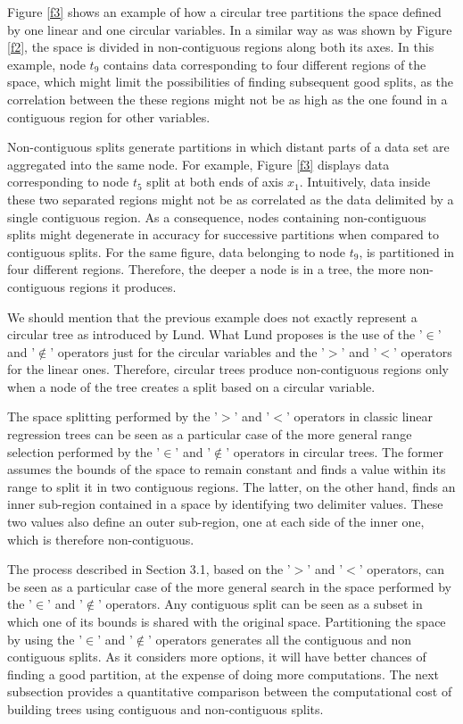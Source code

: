 \documentclass[times,twocolumn,final,authoryear]{elsarticle}
\begin{document}
Figure \ref{f3} shows an example of how a circular tree partitions the space defined by one linear and one circular variables. In a similar way as was shown by Figure \ref{f2}, the space is divided in non-contiguous regions along both its axes. In this example, node $t_9$ contains data corresponding to four different regions of the space, which might limit the possibilities of finding subsequent good splits, as the correlation between the these regions might not be as high as the one found in a contiguous region for other variables. 

Non-contiguous splits generate partitions in which distant parts of a data set are aggregated into the same node. For example, Figure \ref{f3} displays data corresponding to node $t_5$ split at both ends of axis $x_1$. Intuitively, data inside these two separated regions might not be as correlated as the data delimited by a single contiguous region. As a consequence, nodes containing non-contiguous splits might degenerate in accuracy for successive partitions when compared to contiguous splits. For the same figure, data belonging to node $t_9$, is partitioned in four different regions. Therefore, the deeper a node is in a tree, the more non-contiguous regions it produces.

We should mention that the previous example does not exactly represent a circular tree as introduced by Lund. What Lund proposes is the use of the '$\in$' and '$\notin$' operators just for the circular variables and the '$>$' and '$<$' operators for the linear ones. Therefore, circular trees produce non-contiguous regions only when a node of the tree creates a split based on a circular variable.

The space splitting performed by the '$>$' and '$<$' operators in classic linear regression trees can be seen as a particular case of the more general range selection performed by the '$\in$' and '$\notin$' operators in circular trees. The former assumes the bounds of the space to remain constant and finds a value within its range to split it in two contiguous regions. The latter, on the other hand, finds an inner sub-region contained in a space by identifying two delimiter values. These two values also define an outer sub-region, one at each side of the inner one, which is therefore non-contiguous.

The process described in Section 3.1, based on the '$>$' and '$<$' operators, can be seen as a particular case of the more general search in the space performed by the '$\in$' and '$\notin$' operators. Any contiguous split can be seen as a subset in which one of its bounds is shared with the original space. Partitioning the space by using the '$\in$' and '$\notin$' operators generates all the contiguous and non contiguous splits. As it considers more options, it will have better chances of finding a good partition, at the expense of doing more computations. The next subsection provides a quantitative comparison between the computational cost of building trees using contiguous and non-contiguous splits.
\end{document}
